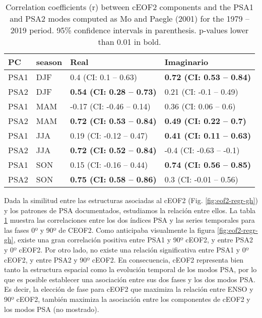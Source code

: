 \documentclass[12pt,oneside]{reedthesis}
\begin{document}
\begin{table}

\caption{\label{tab:psa-eof2}Correlation coefficients (r) between cEOF2 components and the PSA1 and PSA2 modes computed as Mo and Paegle (2001) for the 1979 -- 2019 period. 95\% confidence intervals in parenthesis. p-values lower than 0.01 in bold.}
\centering
\begin{tabular}[t]{ll>{}l>{}l}
\toprule
PC & season & Real & Imaginario\\
\midrule
PSA1 & DJF & 0.4 (CI: 0.1 -- 0.63) & \textbf{0.72 (CI: 0.53 -- 0.84)}\\
PSA2 & DJF & \textbf{0.54 (CI: 0.28 -- 0.73)} & 0.21 (CI: -0.1 -- 0.49)\\
PSA1 & MAM & -0.17 (CI: -0.46 -- 0.14) & 0.36 (CI: 0.06 -- 0.6)\\
PSA2 & MAM & \textbf{0.72 (CI: 0.53 -- 0.84)} & \textbf{0.49 (CI: 0.22 -- 0.7)}\\
PSA1 & JJA & 0.19 (CI: -0.12 -- 0.47) & \textbf{0.41 (CI: 0.11 -- 0.63)}\\
\addlinespace
PSA2 & JJA & \textbf{0.72 (CI: 0.52 -- 0.84)} & -0.4 (CI: -0.63 -- -0.1)\\
PSA1 & SON & 0.15 (CI: -0.16 -- 0.44) & \textbf{0.74 (CI: 0.56 -- 0.85)}\\
PSA2 & SON & \textbf{0.75 (CI: 0.58 -- 0.86)} & 0.3 (CI: -0.01 -- 0.56)\\
\bottomrule
\end{tabular}
\end{table}
Dada la similitud entre las estructuras asociadas al cEOF2 (Fig. \ref{fig:eof2-regr-gh}) y los patrones de PSA documentados, estudiamos la relación entre ellos.
La tabla \ref{tab:psa-eof2} muestra las correlaciones entre los dos índices PSA y las series temporales para las fases 0º y 90º de CEOF2.
Como anticipaba visualmente la figura \ref{fig:eof2-regr-gh}, existe una gran correlación positiva entre PSA1 y 90º cEOF2, y entre PSA2 y 0º cEOF2.
Por otro lado, no existe una relación significativa entre PSA1 y 0º cEOF2, y entre PSA2 y 90º cEOF2.
En consecuencia, cEOF2 representa bien tanto la estructura espacial como la evolución temporal de los modos PSA, por lo que es posible establecer una asociación entre sus dos fases y los dos modos PSA.
Es decir, la elección de fase para cEOF2 que maximiza la relación entre ENSO y 90º cEOF2, también maximiza la asociación entre los componentes de cEOF2 y los modos PSA (no mostrado).
\end{document}
